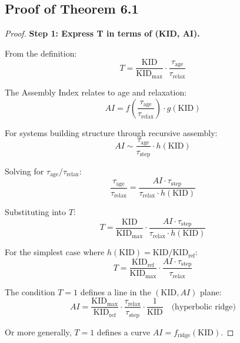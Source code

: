 \documentclass[11pt,a4paper]{article}
\begin{document}
\subsection{Proof of Theorem 6.1}

\begin{proof}
\textbf{Step 1: Express T in terms of (KID, AI).}

From the definition:
\begin{equation}
T = \frac{\text{KID}}{\text{KID}_{\max}} \cdot \frac{\tau_{\text{age}}}{\tau_{\text{relax}}}
\end{equation}

The Assembly Index relates to age and relaxation:
\begin{equation}
AI = f\left(\frac{\tau_{\text{age}}}{\tau_{\text{relax}}}\right) \cdot g(\text{KID})
\end{equation}

For systems building structure through recursive assembly:
\begin{equation}
AI \sim \frac{\tau_{\text{age}}}{\tau_{\text{step}}} \cdot h(\text{KID})
\end{equation}

Solving for $\tau_{\text{age}}/\tau_{\text{relax}}$:
\begin{equation}
\frac{\tau_{\text{age}}}{\tau_{\text{relax}}} = \frac{AI \cdot \tau_{\text{step}}}{\tau_{\text{relax}} \cdot h(\text{KID})}
\end{equation}

Substituting into $T$:
\begin{equation}
T = \frac{\text{KID}}{\text{KID}_{\max}} \cdot \frac{AI \cdot \tau_{\text{step}}}{\tau_{\text{relax}} \cdot h(\text{KID})}
\end{equation}

For the simplest case where $h(\text{KID}) = \text{KID}/\text{KID}_{\text{ref}}$:
\begin{equation}
T = \frac{\text{KID}_{\text{ref}}}{\text{KID}_{\max}} \cdot \frac{AI \cdot \tau_{\text{step}}}{\tau_{\text{relax}}}
\end{equation}

The condition $T = 1$ defines a line in the $(\text{KID}, AI)$ plane:
\begin{equation}
AI = \frac{\text{KID}_{\max}}{\text{KID}_{\text{ref}}} \cdot \frac{\tau_{\text{relax}}}{\tau_{\text{step}}} \cdot \frac{1}{\text{KID}} \quad \text{(hyperbolic ridge)}
\end{equation}

Or more generally, $T = 1$ defines a curve $AI = f_{\text{ridge}}(\text{KID})$.


\end{proof}
\end{document}
